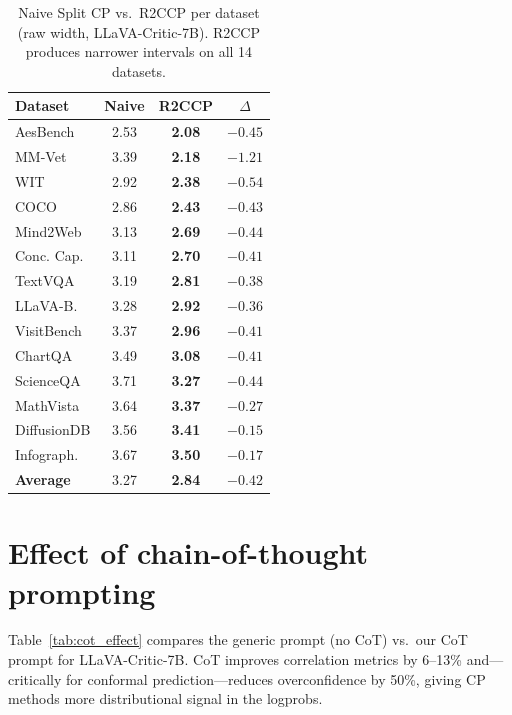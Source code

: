 \documentclass{article}
\begin{document}
\begin{table}[t]
\centering
\caption{Naive Split CP vs.\ R2CCP per dataset (raw width, LLaVA-Critic-7B). R2CCP produces narrower intervals on all 14 datasets.}
\label{tab:naive_vs_r2ccp}
\small
\begin{tabular}{lccc}
\toprule
\textbf{Dataset} & \textbf{Naive} & \textbf{R2CCP} & \textbf{$\Delta$} \\
\midrule
AesBench & 2.53 & \textbf{2.08} & $-0.45$ \\
MM-Vet & 3.39 & \textbf{2.18} & $-1.21$ \\
WIT & 2.92 & \textbf{2.38} & $-0.54$ \\
COCO & 2.86 & \textbf{2.43} & $-0.43$ \\
Mind2Web & 3.13 & \textbf{2.69} & $-0.44$ \\
Conc. Cap. & 3.11 & \textbf{2.70} & $-0.41$ \\
TextVQA & 3.19 & \textbf{2.81} & $-0.38$ \\
LLaVA-B. & 3.28 & \textbf{2.92} & $-0.36$ \\
VisitBench & 3.37 & \textbf{2.96} & $-0.41$ \\
ChartQA & 3.49 & \textbf{3.08} & $-0.41$ \\
ScienceQA & 3.71 & \textbf{3.27} & $-0.44$ \\
MathVista & 3.64 & \textbf{3.37} & $-0.27$ \\
DiffusionDB & 3.56 & \textbf{3.41} & $-0.15$ \\
Infograph. & 3.67 & \textbf{3.50} & $-0.17$ \\
\midrule
\textbf{Average} & 3.27 & \textbf{2.84} & $-0.42$ \\
\bottomrule
\end{tabular}
\end{table}

\section{Effect of chain-of-thought prompting}
\label{app:cot}

Table~\ref{tab:cot_effect} compares the generic prompt (no CoT) vs.\ our CoT prompt for LLaVA-Critic-7B. CoT improves correlation metrics by 6--13\% and---critically for conformal prediction---reduces overconfidence by 50\%, giving CP methods more distributional signal in the logprobs.
\end{document}
